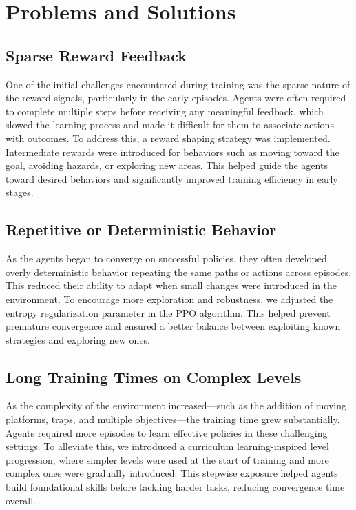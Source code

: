 \documentclass[12pt,oneside,openright,a4paper]{cpe-english-project}
\begin{document}
\section{Problems and Solutions}
\subsection{Sparse Reward Feedback}
One of the initial challenges encountered during training was the sparse nature of the reward signals, particularly in the early episodes. Agents were often required to complete multiple steps before receiving any meaningful feedback, which slowed the learning process and made it difficult for them to associate actions with outcomes. To address this, a reward shaping strategy was implemented. Intermediate rewards were introduced for behaviors such as moving toward the goal, avoiding hazards, or exploring new areas. This helped guide the agents toward desired behaviors and significantly improved training efficiency in early stages.\par
\subsection{Repetitive or Deterministic Behavior}
As the agents began to converge on successful policies, they often developed overly deterministic behavior repeating the same paths or actions across episodes. This reduced their ability to adapt when small changes were introduced in the environment. To encourage more exploration and robustness, we adjusted the entropy regularization parameter in the PPO algorithm. This helped prevent premature convergence and ensured a better balance between exploiting known strategies and exploring new ones.\par
\subsection{Long Training Times on Complex Levels}
As the complexity of the environment increased—such as the addition of moving platforms, traps, and multiple objectives—the training time grew substantially. Agents required more episodes to learn effective policies in these challenging settings. To alleviate this, we introduced a curriculum learning-inspired level progression, where simpler levels were used at the start of training and more complex ones were gradually introduced. This stepwise exposure helped agents build foundational skills before tackling harder tasks, reducing convergence time overall.\par
\end{document}
